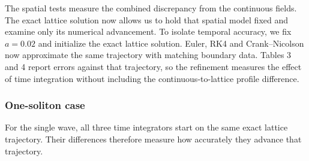 \documentclass{article}
\begin{document}
The spatial tests measure the combined discrepancy from the continuous fields. The exact lattice solution now allows us to hold that spatial model fixed and examine only its numerical advancement. To isolate temporal accuracy, we fix \(a=0.02\) and initialize the exact lattice solution. Euler, RK4 and Crank–Nicolson now approximate the same trajectory with matching boundary data. Tables 3 and 4 report errors against that trajectory, so the refinement measures the effect of time integration without including the continuous-to-lattice profile difference.

\subsubsection*{One-soliton case}

For the single wave, all three time integrators start on the same exact lattice trajectory. Their differences therefore measure how accurately they advance that trajectory.
\end{document}
